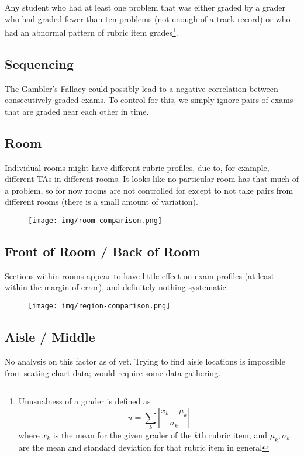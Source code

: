 \documentclass{article}
\begin{document}
        Any student who had at least one problem that was either graded by a grader who had graded fewer
            than ten problems (not enough of a track record) or who had an abnormal pattern of rubric item
            grades\footnote{Unusualness of a grader is defined as
                $$u = \sum_k \left|\frac{x_k - \mu_k}{\sigma_k}\right|$$ where $x_k$ is the mean for the
                given grader of the $k$th rubric item, and $\mu_k, \sigma_k$ are the mean and standard
                deviation for that rubric item in general}.
    \subsection{Sequencing}
        The Gambler's Fallacy could possibly lead to a negative correlation between consecutively graded
            exams. To control for this, we simply ignore pairs of exams that are graded near each other in
            time.
    \subsection{Room}
        Individual rooms might have different rubric profiles, due to, for example, different TAs in
            different rooms. It looks like no particular room has that much of a problem, so for now
            rooms are not controlled for except to not take pairs from different rooms (there is a
            small amount of variation).
        \begin{figure}[h!]
            \centering
            \texttt{[image: img/room-comparison.png]}
        \end{figure}
    \subsection{Front of Room / Back of Room}
        Sections within rooms appear to have little effect on exam profiles (at least within the
            margin of error), and definitely nothing systematic.
        \begin{figure}[h!]
            \centering
            \texttt{[image: img/region-comparison.png]}
        \end{figure}
    \subsection{Aisle / Middle}
        No analysis on this factor as of yet. Trying to find aisle locations is impossible from
            seating chart data; would require some data gathering.
\end{document}
